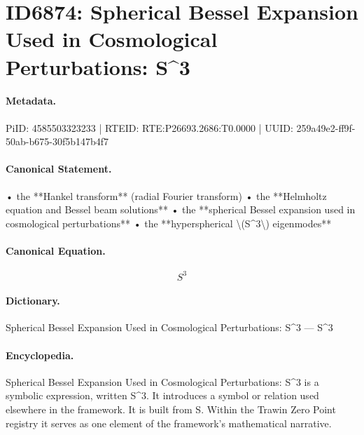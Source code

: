 \section*{ID6874: Spherical Bessel Expansion Used in Cosmological Perturbations: S\textasciicircum{}3}
\paragraph{Metadata.}
PiID: 4585503323233 | RTEID: RTE:P26693.2686:T0.0000 | UUID: 259a49e2-ff9f-50ab-b675-30f5b147b4f7

\paragraph{Canonical Statement.}
• the **Hankel transform** (radial Fourier transform) • the **Helmholtz equation and Bessel beam solutions** • the **spherical Bessel expansion used in cosmological perturbations** • the **hyperspherical \textbackslash{}(S\textasciicircum{}3\textbackslash{}) eigenmodes**

\paragraph{Canonical Equation.}
\[
S^3
\]

\paragraph{Dictionary.}
Spherical Bessel Expansion Used in Cosmological Perturbations: S\textasciicircum{}3 — S\textasciicircum{}3

\paragraph{Encyclopedia.}
Spherical Bessel Expansion Used in Cosmological Perturbations: S\textasciicircum{}3 is a symbolic expression, written S\textasciicircum{}3. It introduces a symbol or relation used elsewhere in the framework. It is built from S. Within the Trawin Zero Point registry it serves as one element of the framework's mathematical narrative.
